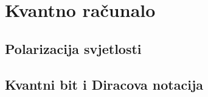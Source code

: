 \chapter{Kvantno računalo}

\section{Polarizacija svjetlosti}

\section{Kvantni bit i Diracova notacija}

